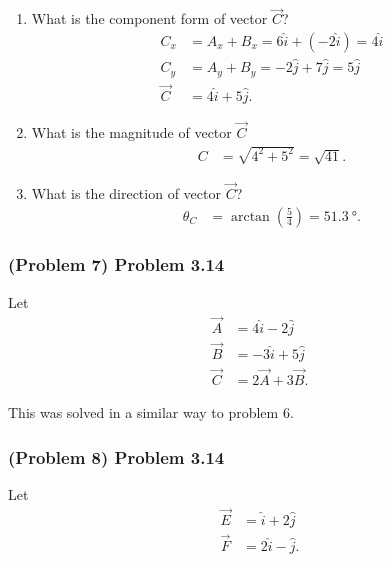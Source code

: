 \begin{solution}
	\begin{enumerate}[label=\Alph*.]
		\item What is the component form of vector $\vec{C}$?
		      \begin{align*}
			      C_{x} &= A_{x} + B_{x} = 6\hat{i} + \left( -2\hat{i} \right) = 4\hat{i} \\
			      C_{y} &= A_{y} + B_{y} = -2\hat{j} + 7\hat{j} = 5\hat{j} \\
			      \vec{C} &= 4\hat{i} + 5\hat{j}
			      .\end{align*}
		\item What is the magnitude of vector $\vec{C}$
		      \begin{align*}
			      C &= \sqrt{4^2 + 5^2} = \sqrt{41}
			      .\end{align*}
		\item What is the direction of vector $\vec{C}$?
		      \begin{align*}
			      \theta_{C} &= \arctan \left( \frac{5}{4} \right) = \SI{51.3}{\degree}
			      .\end{align*}
	\end{enumerate}
\end{solution}

\newpage

\subsubsection{(Problem 7) Problem 3.14}

Let
\begin{align*}
	\vec{A} &= 4\hat{i} - 2\hat{j} \\
	\vec{B} &= -3\hat{i} + 5\hat{j} \\
	\vec{C} &= 2\vec{A} + 3\vec{B}
	.\end{align*}

\begin{solution}
	This was solved in a similar way to problem 6.
\end{solution}

\newpage

\subsubsection{(Problem 8) Problem 3.14}

Let
\begin{align*}
	\vec{E} &= \hat{i} + 2\hat{j} \\
	\vec{F} &= 2\hat{i} - \hat{j}
	.\end{align*}

